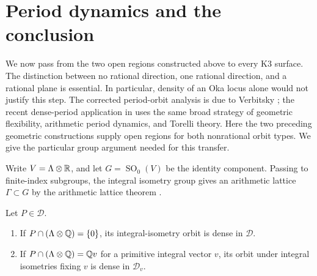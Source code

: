 \section{Period dynamics and the conclusion}
\label{dyn:section}

We now pass from the two open regions constructed above to every
K3 surface. The distinction between no rational direction, one
rational direction, and a rational plane is essential. In
particular, density of an Oka locus alone would not justify this
step. The corrected period-orbit analysis is due to Verbitsky
\cite{VerbitskyErratum}; the recent dense-period application in
\cite{XieZhao} uses the same broad strategy of geometric flexibility, arithmetic
period dynamics, and Torelli theory. Here the two preceding geometric
constructions supply open regions for both nonrational orbit types.
We give the particular group argument needed for this transfer.

Write $V=\Lambda\otimes\mathbb R$, and let
$G=\operatorname{SO}_0(V)$ be the identity component. Passing to
finite-index subgroups, the integral isometry group gives an
arithmetic lattice $\Gamma\subset G$ by the arithmetic lattice
theorem \cite{BorelHarishChandra}.

\begin{lemma}\label{dyn:orbits}
Let $P\in\mathcal D$.
\begin{enumerate}
\item If $P\cap(\Lambda\otimes\mathbb Q)=\{0\}$, its integral-isometry
orbit is dense in $\mathcal D$.
\item If $P\cap(\Lambda\otimes\mathbb Q)=\mathbb Q v$ for a primitive integral
vector $v$, its orbit under integral isometries fixing $v$ is
dense in $\mathcal D_v$.
\end{enumerate}
\end{lemma}

